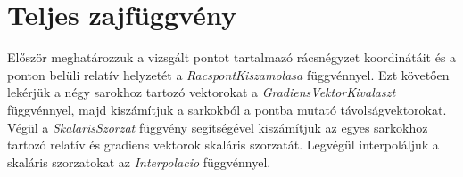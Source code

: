 \documentclass[12pt]{article}
\begin{document}
\section{Teljes zajfüggvény}
Először meghatározzuk a vizsgált pontot tartalmazó rácsnégyzet koordinátáit és
a ponton belüli relatív helyzetét a \textit{RacspontKiszamolasa} függvénnyel.
Ezt követően lekérjük a négy sarokhoz tartozó vektorokat a
\textit{GradiensVektorKivalaszt} függvénnyel, majd kiszámítjuk a sarkokból a
pontba mutató távolságvektorokat. Végül a \textit{SkalarisSzorzat} függvény
segítségével kiszámítjuk az egyes sarkokhoz tartozó relatív és gradiens
vektorok skaláris szorzatát. Legvégül interpoláljuk a skaláris szorzatokat az
\textit{Interpolacio} függvénnyel.
\begin{algorithm}
    \linespread{0.925}\selectfont
    \caption{Teljes zajfüggvény}
    \DontPrintSemicolon


\end{algorithm}
\end{document}
